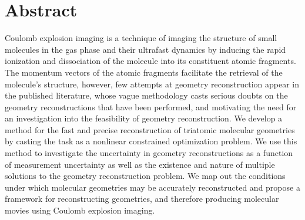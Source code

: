 \begingroup
\let\clearpage\relax
\let\cleardoublepage\relax
\let\cleardoublepage\relax


\chapter*{Abstract}
Coulomb explosion imaging is a technique of imaging the structure of small molecules in the gas phase and their ultrafast dynamics by inducing the rapid ionization and dissociation of the molecule into its constituent atomic fragments. The momentum vectors of the atomic fragments facilitate the retrieval of the molecule's structure, however, few attempts at geometry reconstruction appear in the published literature, whose vague methodology casts serious doubts on the geometry reconstructions that have been performed, and motivating the need for an investigation into the feasibility of geometry reconstruction. We develop a method for the fast and precise reconstruction of triatomic molecular geometries by casting the task as a nonlinear constrained optimization problem. We use this method to investigate the uncertainty in geometry reconstructions as a function of measurement uncertainty as well as the existence and nature of multiple solutions to the geometry reconstruction problem. We map out the conditions under which molecular geometries may be accurately reconstructed and propose a framework for reconstructing geometries, and therefore producing molecular movies using Coulomb explosion imaging.


\vfill
\endgroup			
\vfill
